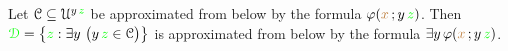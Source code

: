 % 
% 
% 
% 
% 
% 
% 
% 
% 

\begin{proposition}\label{prop_sh_exp_qe}
Let $\EuScript C\subseteq\EuScript U^{y\,{\color{green} z}}$ be approximated from below by the formula $\varphi({\color{brown} x}\,;y\,{\color{green} z})$.
Then ${\color{green}\EuScript D}=\big\{{\color{green} z}:\exists y\ \big(y\,{\color{green} z}\in\EuScript C\big)\big\}$ is approximated from below by the formula $\exists y\,\varphi({\color{brown} x}\,;y\,{\color{green} z})$.
\end{proposition}

